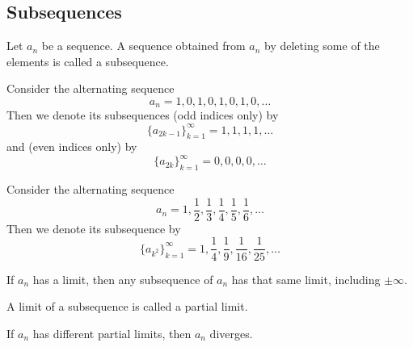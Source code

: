 \subsection{Subsequences}\label{subsec-subsequences}

\begin{definition}\label{def-subsequence}
	Let $a_n$ be a sequence. A sequence obtained from $a_n$ by deleting some of
	the elements is called a subsequence.
\end{definition}

\begin{exm}\label{exm-subsequence:1}
	Consider the alternating sequence
	\begin{equation*}
		a_n = 1,0,1,0,1,0,1,0,\dots
	\end{equation*}
	Then we denote its subsequences (odd indices only) by
	\begin{equation*}
		\{a_{2k-1}\}_{k=1}^\infty = 1,1,1,1,\dots
	\end{equation*}
	and (even indices only) by
	\begin{equation*}
		\{a_{2k}\}_{k=1}^\infty = 0,0,0,0,\dots
	\end{equation*}
\end{exm}

\begin{exm}\label{exm-subsequence:2}
	Consider the alternating sequence
	\begin{equation*}
		a_n = 1,\frac{1}{2},\frac{1}{3},\frac{1}{4},\frac{1}{5},\frac{1}{6},\dots
	\end{equation*}
	Then we denote its subsequence by
	\begin{equation*}
		\{a_{k^2}\}_{k=1}^\infty = 1,\frac{1}{4},\frac{1}{9},\frac{1}{16},\frac{1}{25},\dots
	\end{equation*}
\end{exm}

\begin{thm}\label{thm-subsequence-converges}
	If $a_n$ has a limit, then any subsequence of $a_n$ has that same limit, including $\pm\infty$.
\end{thm}

\begin{definition}\label{def-partial-limit}
	A limit of a subsequence is called a partial limit.
\end{definition}

\begin{crl}\label{crl-subsequence-different-limits}
	If $a_n$ has different partial limits, then $a_n$ diverges.
\end{crl}

